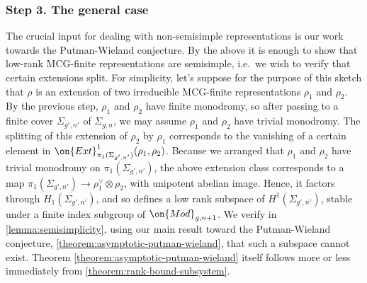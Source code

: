 \documentclass[12 pt]{amsart}
\theoremstyle{plain}
\theoremstyle{definition}
\theoremstyle{remark}
\numberwithin{equation}{section}
\begin{document}
\subsubsection{Step 3. The general case} 
\label{subsubsection:step-3}
The crucial input for dealing with
non-semisimple representations is our work towards the
Putman-Wieland conjecture. By the above it is enough to show that low-rank
MCG-finite representations are semisimple, i.e.~we wish to verify that certain
extensions split. 
For simplicity, let's suppose for the purpose of this sketch that $\rho$ is an extension of two irreducible MCG-finite representations
$\rho_1$ and $\rho_2$. 
By the previous step, $\rho_1$ and $\rho_2$ have finite monodromy, so after
passing to a finite cover $\Sigma_{g',n'}$ of $\Sigma_{g,n}$, we may assume
$\rho_1$ and $\rho_2$ have trivial monodromy.
The splitting of this extension of $\rho_2$ by $\rho_1$ corresponds to the vanishing of a certain
element in $\on{Ext}^1_{\pi_1(\Sigma_{g',n'})}(\rho_1, \rho_2)$.
Because we arranged that $\rho_1$ and $\rho_2$ have trivial monodromy
on $\pi_1(\Sigma_{g',n'})$, the above extension class corresponds to a map
$\pi_1(\Sigma_{g',n'}) \to \rho_1^\vee \otimes \rho_2$, with unipotent abelian
image. Hence, it factors through $H_1(\Sigma_{g',n'})$,
and so defines a low rank subspace of $H^1(\Sigma_{g',n'})$, stable under a
finite index subgroup of $\on{Mod}_{g,n+1}$.
We verify in \autoref{lemma:semisimplicity}, 
using our main result toward the Putman-Wieland conjecture,
\autoref{theorem:asymptotic-putman-wieland},
that such a subspace cannot exist. Theorem \autoref{theorem:asymptotic-putman-wieland} itself follows more or less immediately from \autoref{theorem:rank-bound-subsystem}.

\end{document}
